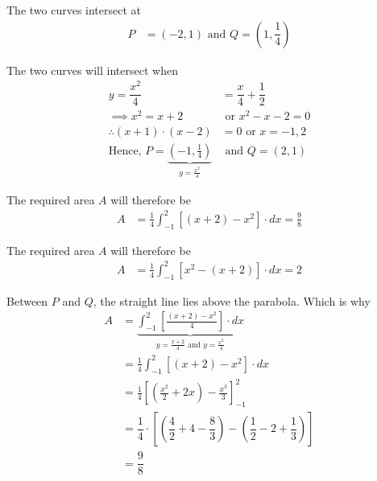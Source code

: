 \documentclass[14pt,fleqn]{extarticle}
\newcommand\intg{\int_{-1}^2}
\begin{document}
\newcard

The two curves intersect at 
\begin{align}
P &= \left( -2, 1\right)  \text{ and } Q = \left( 1, \dfrac{1}{4}\right) 
\end{align} 

\newcard

The two curves will intersect when 
%
\begin{align}
y = \dfrac{x^2}{4} &= \dfrac{x}{4} + \dfrac{1}{2} \\ 
\implies x^2 = x + 2 &\text{ or } x^2 - x - 2 = 0 \\ 
\therefore (x+1)\cdot (x-2) &= 0  \text{ or }  x = -1, 2 \\
\text{Hence, }P = \underbrace{\left( -1,\frac{1}{4}\right)}_{y=\frac{x^2}{4}} & \text{ and } Q = \left(2,1 \right) 
\end{align}

\newcard

The required area $A$ will therefore be 
\begin{align}
	A &= \frac{1}{4}\intg \left[\left(x+2 \right) - x^2\right]\cdot dx = \frac{9}{8}
\end{align}

\newcard 

The required area $A$ will therefore be 
\begin{align}
	A &= \frac{1}{4}\intg \left[x^2 - \left(x+2 \right) \right]\cdot dx = 2
\end{align}

\newcard 

Between $P$ and $Q$, the straight line lies above the parabola. Which is why 
\begin{align}
	A &= \underbrace{\intg \left[ \frac{\left(x+2 \right) - x^2}{4} \right]\cdot dx}_{y = \frac{x+2}{4}\text{ and } y = \frac{x^2}{4}} \\
	&= \frac{1}{4}\intg \left[ \left(x+2 \right) - x^2 \right]\cdot dx \\
	&= \frac{1}{4} \left[ \left(\frac{x^2}{2} + 2x \right) - \frac{x^3}{3} \right]_{-1}^2 \\
	&= \dfrac{1}{4}\cdot\left[ \left( \dfrac{4}{2}+4-\dfrac{8}{3}\right) 
- \left( \dfrac{1}{2}-2+\dfrac{1}{3}\right)\right]\\
&= \dfrac{9}{8}
\end{align}
\end{document}
